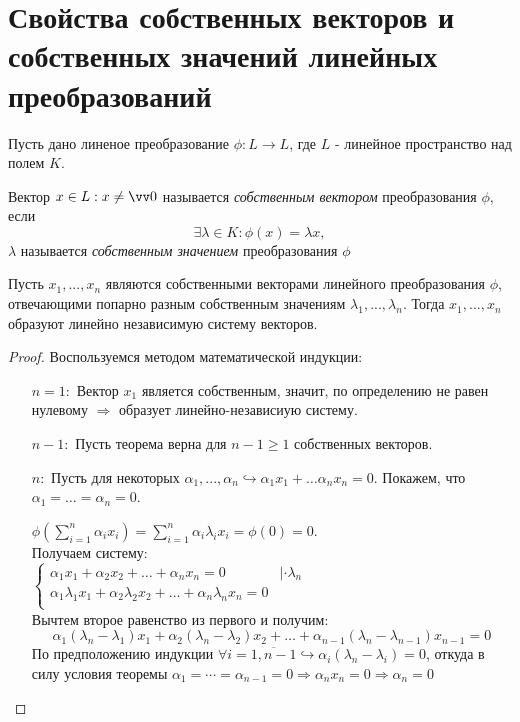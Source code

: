 \section{Свойства собственных векторов и собственных значений линейных преобразований}
  Пусть дано линеное преобразование $\phi: L \rightarrow L$, где $L$ - линейное пространство над полем $K$.
  \begin{defn}
  Вектор $x \in L: x \neq \vv 0$ называется \textit{собственным вектором} преобразования $\phi$, если 
  \begin{equation}
    \exists \lambda \in K: \phi(x)=\lambda x,
  \end{equation}
$\lambda$ называется \textit{собственным значением} преобразования $\phi$ 
  \end{defn}
  \begin{thm}
  Пусть $x_1,...,x_n$ являются собственными векторами линейного преобразования $\phi$, отвечающими попарно разным собственным значениям $\lambda_1,...,\lambda_n$. Тогда $x_1,...,x_n$ образуют линейно независимую систему векторов.
  \end{thm}
  \begin{proof}
  Воспользуемся методом математической индукции:
  \linebreak\vspace*{-\baselineskip}
  \begin{itemize}
  \item[\underline{$n=1:$}] Вектор $x_1$ является собственным, значит, по определению не равен нулевому $\Rightarrow$ образует линейно-независиую систему.
  \item[\underline{$n-1:$}] Пусть теорема верна для $n-1\ge 1$ собственных векторов.
  
  \item[\underline{$n:$}] Пусть для некоторых $\alpha_1,...,\alpha_n \hookrightarrow \alpha_1 x_1 + \ldots \alpha_n x_n = 0$. Покажем, что $\alpha_1=\ldots=\alpha_n=0$.
  
  $\phi(\sum_{i=1}^n \alpha_i x_i)=\sum_{i=1}^n \alpha_i \lambda_i x_i = \phi(0)=0$. \\
  Получаем систему: \\
  $\begin{cases}
    \alpha_1 x_1 + \alpha_2 x_2 + \ldots + \alpha_n x_n = 0 & |\cdot \lambda_n \\
    \alpha_1 \lambda_1 x_1 + \alpha_2 \lambda_2 x_2 + \ldots + \alpha_n \lambda_n x_n = 0 \\
  \end{cases}$ \\
  Вычтем второе равенство из первого и получим:
  \begin{equation*}
  \alpha_1 (\lambda_n-\lambda_1) x_1 + \alpha_2 (\lambda_n-\lambda_2) x_2 + \ldots + \alpha_{n-1} (\lambda_n-\lambda_{n-1}) x_{n-1} = 0
  \end{equation*}
  По предположению индукции $\forall i=\overline{1,n-1} \hookrightarrow \alpha_i(\lambda_n-\lambda_i)=0$, откуда в силу условия теоремы $\alpha_1=\cdots=\alpha_{n-1}=0 \Rightarrow \alpha_n x_n=0 \Rightarrow \alpha_n=0$
  \end{itemize}
  \vspace{-1.65\baselineskip}
  \end{proof}
